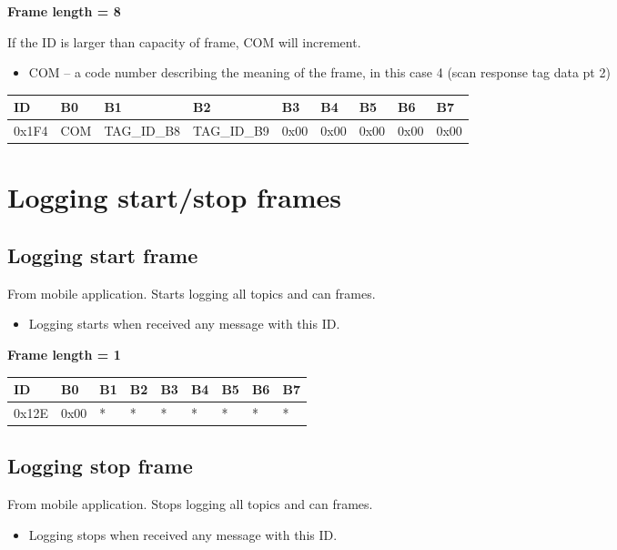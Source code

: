 \documentclass{article}
\begin{document}
\textbf{Frame length = 8}

If the ID is larger than capacity of frame, COM will increment.

\begin{itemize}
    \item COM -- a code number describing the meaning of the frame, in this case 4 (scan response tag data pt 2)
\end{itemize}

\begin{center}
    \begin{tabular}{| p{20pt} | p{20pt} | p{50pt} | p{50pt} | p{50pt} | p{50pt} | p{50pt} | p{50pt} | p{50pt} |}
        \hline
        ID    & B0  & B1          & B2          & B3   & B4   & B5   & B6   & B7   \\
        \hline
        0x1F4 & COM & TAG\_ID\_B8 & TAG\_ID\_B9 & 0x00 & 0x00 & 0x00 & 0x00 & 0x00
        \\
        \hline
    \end{tabular}
\end{center}
\newpage
\section{Logging start/stop frames}
\subsection{Logging start frame}
From mobile application. Starts logging all topics and can frames. 
\begin{itemize}
    \item Logging starts when received any message with this ID.
\end{itemize}

\textbf{Frame length = 1}
\begin{center}
    \begin{tabular}{| p{20pt} | p{40pt} | p{55pt} | p{55pt} | p{40pt} | p{40pt} | p{40pt} | p{40pt} | p{40pt} |}
        \hline
        ID    & B0  & B1       & B2 & B3 & B4 & B5 & B6 & B7 \\
        \hline
        0x12E & 0x00 & * & *  & *  & *  & *  & *  & *  \\
        \hline
    \end{tabular}
\end{center}
\subsection{Logging stop frame}
From mobile application. Stops logging all topics and can frames. 
\begin{itemize}
    \item Logging stops when received any message with this ID.
\end{itemize}
\end{document}
